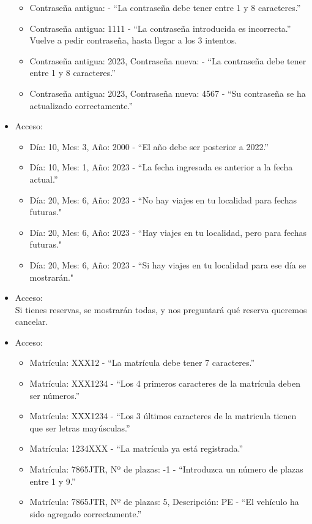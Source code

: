 \begin{itemize}
  \begin{itemize}
    \item Contraseña antigua:  - “La contraseña debe tener entre 1 y 8 caracteres.”
    \item Contraseña antigua: 1111 - “La contraseña introducida es incorrecta.” Vuelve a pedir contraseña, hasta llegar a los 3 intentos.
    \item Contraseña antigua: 2023, Contraseña nueva:  - “La contraseña debe tener entre 1 y 8 caracteres.”
    \item Contraseña antigua: 2023, Contraseña nueva: 4567 - “Su contraseña se ha actualizado correctamente.”
  \end{itemize}
  \item Acceso:
  \begin{itemize}
    \item Día: 10, Mes: 3, Año: 2000 - “El año debe ser posterior a 2022.”
    \item Día: 10, Mes: 1, Año: 2023 - “La fecha ingresada es anterior a la fecha actual.”
    \item Día: 20, Mes: 6, Año: 2023 - “No hay viajes en tu localidad para fechas futuras."
    \item Día: 20, Mes: 6, Año: 2023 - “Hay viajes en tu localidad, pero para fechas futuras."
    \item Día: 20, Mes: 6, Año: 2023 - “Si hay viajes en tu localidad para ese día se mostrarán."
  \end{itemize}
  \item Acceso:\\
    Si tienes reservas, se mostrarán todas, y nos preguntará qué reserva queremos cancelar.
  \item Acceso:
  \begin{itemize}
    \item Matrícula: XXX12 - “La matrícula debe tener 7 caracteres.”
    \item Matrícula: XXX1234 - “Los 4 primeros caracteres de la matrícula deben ser números.”
    \item Matrícula: XXX1234 - “Los 3 últimos caracteres de la matricula tienen que ser letras mayúsculas.”
    \item Matrícula: 1234XXX - “La matrícula ya está registrada.”
    \item Matrícula: 7865JTR, Nº de plazas: -1 - “Introduzca un número de plazas entre 1 y 9.”
    \item Matrícula: 7865JTR, Nº de plazas: 5, Descripción: PE - “El vehículo ha sido agregado correctamente.”

\end{itemize}
\end{itemize}
